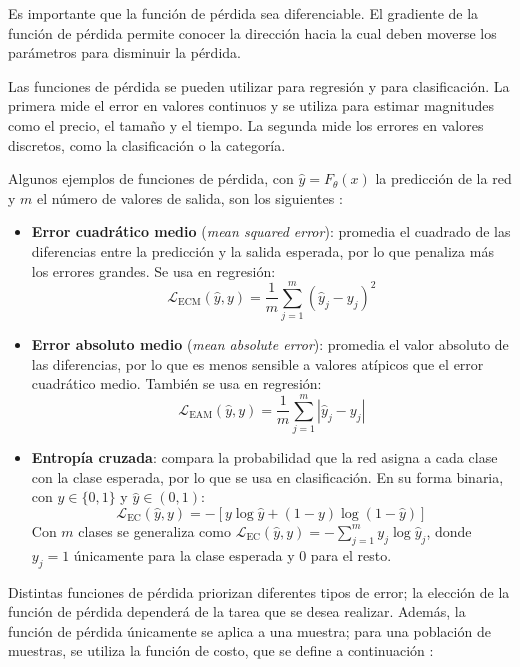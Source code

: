 Es importante que la función de pérdida sea diferenciable. El gradiente de la función de pérdida permite conocer la dirección hacia la cual deben moverse los parámetros para disminuir la pérdida.

Las funciones de pérdida se pueden utilizar para regresión y para clasificación. La primera mide el error en valores continuos y se utiliza para estimar magnitudes como el precio, el tamaño y el tiempo. La segunda mide los errores en valores discretos, como la clasificación o la categoría.

Algunos ejemplos de funciones de pérdida, con $\hat{y} = F_\theta(x)$ la predicción de la red y $m$ el número de valores de salida, son los siguientes \cite{hastie2009_esl, goodfellow2016_dl}:

\begin{itemize}
	\item \textbf{Error cuadrático medio} (\textit{mean squared error}): promedia el cuadrado de las diferencias entre la predicción y la salida esperada, por lo que penaliza más los errores grandes. Se usa en regresión:
	\[
	\mathcal{L}_{\text{ECM}}(\hat{y}, y) = \frac{1}{m} \sum_{j = 1}^{m} (\hat{y}_j - y_j)^2
	\]
	\item \textbf{Error absoluto medio} (\textit{mean absolute error}): promedia el valor absoluto de las diferencias, por lo que es menos sensible a valores atípicos que el error cuadrático medio. También se usa en regresión:
	\[
	\mathcal{L}_{\text{EAM}}(\hat{y}, y) = \frac{1}{m} \sum_{j = 1}^{m} |\hat{y}_j - y_j|
	\]
	\item \textbf{Entropía cruzada}: compara la probabilidad que la red asigna a cada clase con la clase esperada, por lo que se usa en clasificación. En su forma binaria, con $y \in \{0, 1\}$ y $\hat{y} \in (0, 1)$:
	\[
	\mathcal{L}_{\text{EC}}(\hat{y}, y) = -\left[ y \log \hat{y} + (1 - y) \log (1 - \hat{y}) \right]
	\]
	Con $m$ clases se generaliza como $\mathcal{L}_{\text{EC}}(\hat{y}, y) = -\sum_{j = 1}^{m} y_j \log \hat{y}_j$, donde $y_j = 1$ únicamente para la clase esperada y $0$ para el resto.
\end{itemize}

Distintas funciones de pérdida priorizan diferentes tipos de error; la elección de la función de pérdida dependerá de la tarea que se desea realizar. Además, la función de pérdida únicamente se aplica a una muestra; para una población de muestras, se utiliza la función de costo, que se define a continuación \cite{bergmann_funcion_perdida, ultralytics2025_funcion_perdida}:

